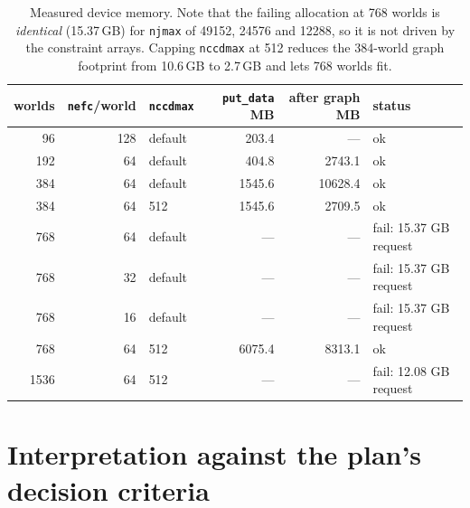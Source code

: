 \documentclass[11pt,a4paper]{article}
\newcommand{\code}[1]{\texttt{\small #1}}
\begin{document}
\begin{table}[htbp]
\centering
\footnotesize
\caption{Measured device memory. Note that the failing allocation at 768 worlds is \emph{identical} (15.37\,GB) for \code{njmax} of 49152, 24576 and 12288, so it is not driven by the constraint arrays. Capping \code{nccdmax} at 512 reduces the 384-world graph footprint from 10.6\,GB to 2.7\,GB and lets 768 worlds fit.}
\label{tab:memory}
\begin{tabular}{rrlrrl}
\toprule
\textbf{worlds} & \code{nefc}\textbf{/world} & \code{nccdmax} & \code{put\_data} \textbf{MB} & \textbf{after graph MB} & \textbf{status} \\
\midrule
96 & 128 & default & 203.4 & --- & ok \\
192 & 64 & default & 404.8 & 2743.1 & ok \\
384 & 64 & default & 1545.6 & 10628.4 & ok \\
384 & 64 & 512 & 1545.6 & 2709.5 & ok \\
768 & 64 & default & --- & --- & fail: 15.37 GB request \\
768 & 32 & default & --- & --- & fail: 15.37 GB request \\
768 & 16 & default & --- & --- & fail: 15.37 GB request \\
768 & 64 & 512 & 6075.4 & 8313.1 & ok \\
1536 & 64 & 512 & --- & --- & fail: 12.08 GB request \\
\bottomrule
\end{tabular}
\end{table}

\section{Interpretation against the plan's decision criteria}
\end{document}
